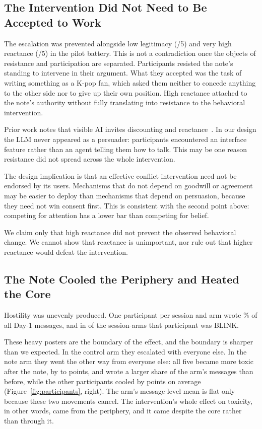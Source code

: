 \documentclass[manuscript,screen,review,anonymous]{acmart}
\begin{document}
\subsection{The Intervention Did Not Need to Be Accepted to Work}

The escalation was prevented alongside low legitimacy (\StatlegitM/5) and
very high reactance (\StatreactM/5) in the pilot battery. This is not a
contradiction once the objects of resistance and participation are
separated. Participants resisted the note's standing to intervene in their
argument. What they accepted was the task of writing something as a K-pop
fan, which asked them neither to concede anything to the other side nor to
give up their own position. High reactance attached to the note's authority
without fully translating into resistance to the behavioral intervention.

Prior work notes that visible AI invites discounting and
reactance~\cite{jakesch2019}. In our design the LLM never appeared as a
persuader: participants encountered an interface feature rather than an agent
telling them how to talk. This may be one reason resistance did not spread
across the whole intervention.

The design implication is that an effective conflict intervention need not be
endorsed by its users. Mechanisms that do not depend on goodwill or agreement
may be easier to deploy than mechanisms that depend on persuasion, because
they need not win consent first. This is consistent with the second point
above: competing for attention has a lower bar than competing for belief.

We claim only that high reactance did not prevent the observed behavioral
change. We cannot show that reactance is unimportant, nor rule out that
higher reactance would defeat the intervention.

\subsection{The Note Cooled the Periphery and Heated the Core}

Hostility was unevenly produced. One participant per session and arm wrote
\StatheavyMsgPct\% of all Day-1 messages, and in \StatheavyBlinkN{} of the
\StatheavyTotalN{} session-arms that participant was BLINK.

These heavy posters are the boundary of the effect, and the boundary is
sharper than we expected. In the control arm they escalated with everyone
else. In the note arm they went the other way from everyone else: all five
became more toxic after the note, by \StatexptHeavyDiffMin{} to
\StatexptHeavyDiffMax{} points, and wrote a larger share of the arm's
messages than before, while the other \StatexptPeriN{} participants cooled
by \StatexptPeriDiff{} points on average (Figure~\ref{fig:participants},
right). The arm's message-level mean is flat only because these two
movements cancel. The intervention's whole effect on toxicity, in other
words, came from the periphery, and it came despite the core rather than
through it.
\end{document}
